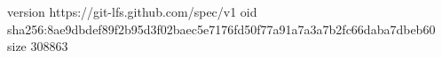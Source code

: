 version https://git-lfs.github.com/spec/v1
oid sha256:8ae9dbdef89f2b95d3f02baec5e7176fd50f77a91a7a3a7b2fc66daba7dbeb60
size 308863
